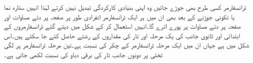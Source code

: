 	ٹرانسفارمر کسی طرح بھی جوڑے جائیں وہ اپنی بنیادی کارکردگی تبدیل نہیں کرتے لہٰذا انہیں ستارہ نما یا تکونی جوڑنے کے بعد بھی ان میں ہر ایک ٹرانسفارمر انفرادی طور پر صفحہ  پر دئے مساوات   اور صفحہ  پر دئے مساوات   پر پورے اترے گا۔انہیں استعمال کر کے شکل   میں دیئے گئے ٹرانسفارمروں کے ابتدائی اور ثانوی جانب کی یک مرحلہ اور تار کی مقداروں کے رشتے حاصل کئے جا سکتے ہیں۔اس شکل میں  ہے جہاں   ان میں ایک مرحلہ ٹرانسفارمر کے چکر کی نسبت ہے۔تین مرحلہ ٹرانسفارمر پر لگی تختی پر دونوں جانب تار کی برقی دباو کی نسبت لکھی جاتی ہے۔
\begin{figure}
\centering
\end{figure}
